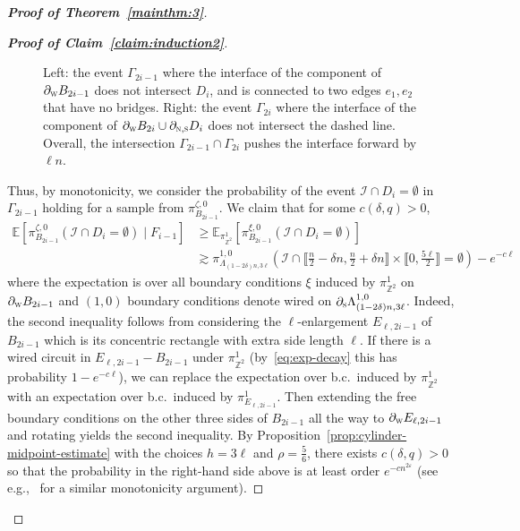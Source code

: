 \documentclass[reqno,11pt]{amsart}
\numberwithin{equation}{section}
\renewcommand{\epsilon}{\varepsilon}
\theoremstyle{definition}{
\newtheorem{example}[theorem]{Example}
\newtheorem{definition}[theorem]{Definition}
\newtheorem*{definition*}{Definition}
\newtheorem{problem}[theorem]{Problem}
\newtheorem{question}[theorem]{Question}
\newtheorem{remark}[theorem]{Remark}
}
\newcommand{\llb }{\llbracket}
\newcommand{\rrb }{\rrbracket}
\renewcommand{\epsilon}{\varepsilon}
\newcommand{\north}{{\textsc{n}}}
\newcommand{\south}{{\textsc{s}}}
\newcommand{\west}{{\textsc{w}}}
\begin{document}
\begin{proof}[\textbf{\emph{Proof of Theorem~\ref{mainthm:3}}}]
\begin{proof}[\textbf{\emph{Proof of Claim~\ref{claim:induction2}}}]
\begin{figure}
\vspace{-0.2cm}
  \caption{Left: the event $\Gamma_{2i-1}$ where the interface of the component of $\partial_\west B_{2i-1}$ does not intersect $D_i$, and is connected to two edges $e_1,e_2$ that have no bridges. Right: the event $\Gamma_{2i}$ where the interface of the component of $\partial_\west B_{2i}\cup \partial_{\north,\south} D_i$ does not intersect the dashed line. Overall, the intersection $\Gamma_{2i-1}\cap \Gamma_{2i}$ pushes the interface forward by $\ell n$.
  \vspace{-0.2cm}
  } 
  \label{fig:pushing-the-interface-2}
\end{figure}
Thus, by monotonicity, we consider the probability of the event $\mathcal I\cap D_i=\emptyset$ in $\Gamma_{2i-1}$ holding for a sample from $\pi^{\zeta,0}_{B_{2i-1}}$. We claim that for some $c(\delta,q)>0$, 
\begin{align*}
\mathbb E[\pi_{B_{2i-1}}^{\zeta,0}(\mathcal I\cap D_i = \emptyset) \mid F_{i-1}] & \geq \mathbb E_{\pi_{\mathbb Z^2}^1} [\pi_{B_{2i-1}}^{\xi,0}(\mathcal I \cap D_i = \emptyset)] \\
& \gtrsim \pi_{\Lambda_{(1-2\delta)n,3\ell}}^{1,0}(\mathcal I \cap \llb \tfrac n2 -\delta n,\tfrac n2 +\delta n\rrb \times \llb  0,\tfrac {5\ell}2\rrb=\emptyset)-e^{-c \ell}
\end{align*}
where the expectation is over all boundary conditions $\xi$ induced by $\pi_{\mathbb Z^2}^1$ on $\partial_\west B_{2i-1}$ and $(1,0)$ boundary conditions denote wired on $\partial_\south \Lambda_{(1-2\delta)n,3\ell}^{1,0}$. Indeed, the second inequality follows from considering the $\ell$-enlargement $E_{\ell,2i-1}$ of $B_{2i-1}$ which is its concentric rectangle with extra side length $\ell$. If there is a wired circuit in $E_{\ell,2i-1} - B_{2i-1}$ under $\pi_{\mathbb Z^2}^1$ (by~\eqref{eq:exp-decay} this has probability $1-e^{-c\ell}$), we can replace the expectation over b.c.\ induced by $\pi_{\mathbb Z^2}^1$ with an expectation over b.c.\ induced by $\pi_{E_{\ell,2i-1}}^1$. Then extending the free boundary conditions on the other three sides of $B_{2i-1}$ all the way to $\partial_\west E_{\ell,2i-1}$ and rotating yields the second inequality.
By Proposition~\ref{prop:cylinder-midpoint-estimate} with the choices $h=3\ell$ and $\rho=\frac 56$, there exists $c(\delta,q)>0$ so that the probability in the right-hand side above is at least order $e^{-cn^{2\epsilon}}$ (see e.g.,~\cite[\S5 and Fig.\ 7]{GL16a} for a similar monotonicity argument).


\end{proof}
\end{proof}
\end{document}
